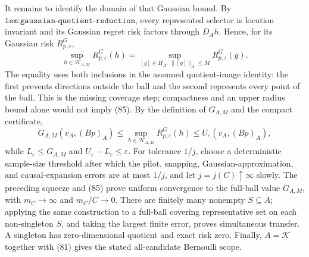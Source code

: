 It remains to identify the domain of that Gaussian bound.  By \(\texttt{lem:gaussian-quotient-reduction}\), every represented selector is location invariant and its Gaussian regret risk factors through \(D_Ah\).  Hence, for its Gaussian risk \(R_{p,\varepsilon}^G\),
\[
\sup_{h\in\mathscr H_{A,M}}R_{p,\varepsilon}^G(h)
=\sup_{[g]\in H_A:\,\lVert[g]\rVert_A\leq M}
  R_{p,\varepsilon}^G(g).                                       \tag{85}
\]
The equality uses both inclusions in the assumed quotient-image identity: the first prevents directions outside the ball and the second represents every point of the ball.  This is the missing coverage step; compactness and an upper radius bound alone would not imply (85).  By the definition of \(G_{A,M}\) and the compact certificate,
\[
G_{A,M}(v_A,(Bp)_A)
\leq\sup_{h\in\mathscr H_{A,M}}R_{p,\varepsilon}^G(h)
\leq U_\varepsilon(v_A,(Bp)_A),
\]
while \(L_\varepsilon\leq G_{A,M}\) and \(U_\varepsilon-L_\varepsilon\leq\varepsilon\).  For tolerance \(1/j\), choose a deterministic sample-size threshold after which the pilot, snapping, Gaussian-approximation, and causal-expansion errors are at most \(1/j\), and let \(j=j(C)\uparrow\infty\) slowly.  The preceding squeeze and (85) prove uniform convergence to the full-ball value \(G_{A,M}\), with \(m_C\to\infty\) and \(m_C/C\to0\).  There are finitely many nonempty \(S\subseteq A\); applying the same construction to a full-ball covering representative set on each non-singleton \(S\), and taking the largest finite error, proves simultaneous transfer.  A singleton has zero-dimensional quotient and exact risk zero.  Finally, \(A=\mathcal K\) together with (81) gives the stated all-candidate Bernoulli scope.